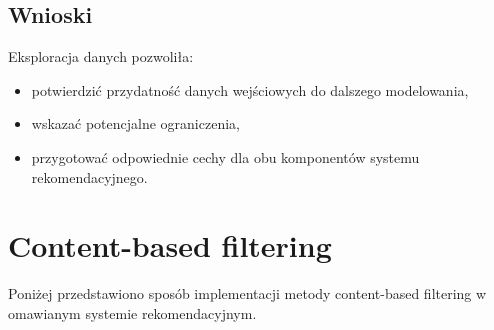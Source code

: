 \documentclass{article}
\begin{document}
\subsection{Wnioski}
Eksploracja danych pozwoliła:
\begin{itemize}
    \item potwierdzić przydatność danych wejściowych do dalszego modelowania,
    \item wskazać potencjalne ograniczenia,
    \item przygotować odpowiednie cechy dla obu komponentów systemu rekomendacyjnego.
\end{itemize}
\section{Content-based filtering}
Poniżej przedstawiono sposób implementacji metody content-based filtering w omawianym systemie rekomendacyjnym.
\end{document}
